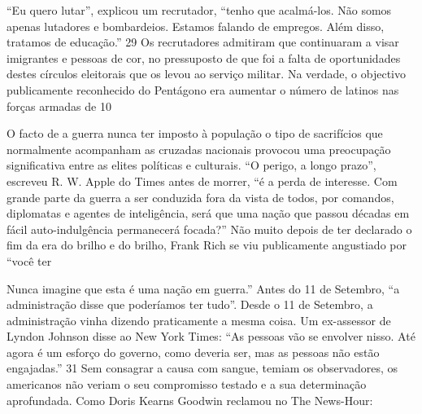 “Eu quero lutar”, explicou um recrutador, “tenho que acalmá-los. Não somos apenas lutadores e bombardeios. Estamos falando de empregos. Além disso, tratamos de educação.” {\color{blue}29} Os recrutadores admitiram que continuaram a visar imigrantes e pessoas de cor, no pressuposto de que foi a falta de oportunidades destes círculos eleitorais que os levou ao serviço militar. Na verdade, o objectivo publicamente reconhecido do Pentágono era aumentar o número de latinos nas forças armadas de 10%
 \par 
O facto de a guerra nunca ter imposto à população o tipo de sacrifícios que normalmente acompanham as cruzadas nacionais provocou uma preocupação significativa entre as elites políticas e culturais. “O perigo, a longo prazo”, escreveu R. W. Apple do Times antes de morrer, “é a perda de interesse. Com grande parte da guerra a ser conduzida fora da vista de todos, por comandos, diplomatas e agentes de inteligência, será que uma nação que passou décadas em fácil auto-indulgência permanecerá focada?” Não muito depois de ter declarado o fim da era do brilho e do brilho, Frank Rich se viu publicamente angustiado por “você ter
 \par 
Nunca imagine que esta é uma nação em guerra.” Antes do {\color{blue}11} de Setembro, “a administração disse que poderíamos ter tudo”. Desde o {\color{blue}11} de Setembro, a administração vinha dizendo praticamente a mesma coisa. Um ex-assessor de Lyndon Johnson disse ao New York Times: “As pessoas vão se envolver nisso. Até agora é um esforço do governo, como deveria ser, mas as pessoas não estão engajadas.” {\color{blue}31} Sem consagrar a causa com sangue, temiam os observadores, os americanos não veriam o seu compromisso testado e a sua determinação aprofundada. Como Doris Kearns Goodwin reclamou no The News-Hour:
